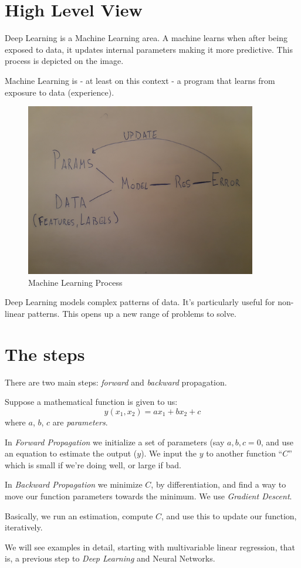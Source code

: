 \section{High Level View}
Deep Learning is a Machine Learning area. A machine learns when after being exposed to data, it updates internal parameters making it more predictive. This process is depicted on the image. 

Machine Learning is - at least on this context -  a program that learns from exposure to data (experience).

\begin{figure}
 \centering
 \includegraphics[width=0.9\textwidth]{ML.jpg}
 \caption{Machine Learning Process}
\end{figure}

Deep Learning models complex patterns of data. It's particularly useful for non-linear patterns. This opens up a new range of problems to solve. 

\section{The steps}
There are two main steps: \textit{forward} and \textit{backward} propagation. 

Suppose a mathematical function is given to us:
$$ y(x_1,x_2) = a x_1 + b x_2 + c$$
where $a$, $b$, $c$ are \textit{parameters}.

In \textit{Forward Propagation} we initialize a set of parameters (say $a,b,c=0$, and use an equation to estimate the output ($y$). We input the $y$ to another function ``$C$'' which is small if we're doing well, or large if bad.

In \textit{Backward Propagation} we minimize $C$, by differentiation, and find a way to move our function parameters towards the minimum. We use \textit{Gradient Descent}.

Basically, we run an estimation, compute $C$, and use this to update our function, iteratively.

We will see examples in detail, starting with multivariable linear regression, that is, a previous step to \textit{Deep Learning} and Neural Networks.
